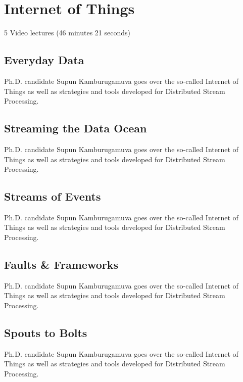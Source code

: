 \chapter{Internet of Things}

  5 Video lectures (46 minutes 21 seconds)

\section{Everyday Data}

Ph.D. candidate Supun Kamburugamuva goes over the so-called Internet of
Things as well as strategies and tools developed for Distributed Stream
Processing.


\section{Streaming the Data Ocean}

Ph.D. candidate Supun Kamburugamuva goes over the so-called Internet of
Things as well as strategies and tools developed for Distributed Stream
Processing.


\section{Streams of Events}

Ph.D. candidate Supun Kamburugamuva goes over the so-called Internet of
Things as well as strategies and tools developed for Distributed Stream
Processing.


\section{Faults \& Frameworks}

Ph.D. candidate Supun Kamburugamuva goes over the so-called Internet of
Things as well as strategies and tools developed for Distributed Stream
Processing.


\section{Spouts to Bolts}

Ph.D. candidate Supun Kamburugamuva goes over the so-called Internet of
Things as well as strategies and tools developed for Distributed Stream
Processing.


